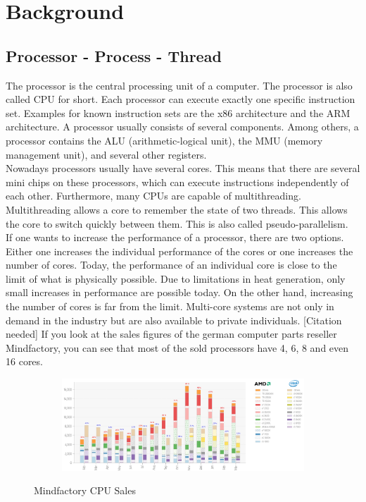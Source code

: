 
\chapter{Background}

\section{Processor - Process - Thread}

The processor is the central processing unit of a computer. The processor is also called CPU for short. Each processor can execute exactly one specific instruction set. Examples for known instruction sets are the x86 architecture and the ARM architecture. A processor usually consists of several components. Among others, a processor contains the ALU (arithmetic-logical unit), the MMU (memory management unit), and several other registers. \cite{Tannenbaum:21}
\\
Nowadays processors usually have several cores. \cite{Tannenbaum:87} This means that there are several mini chips on these processors, which can execute instructions independently of each other. Furthermore, many CPUs are capable of multithreading. Multithreading allows a core to remember the state of two threads. This allows the core to switch quickly between them. This is also called pseudo-parallelism.\cite{Tannenbaum:23}
\\
If one wants to increase the performance of a processor, there are two options. Either one increases the individual performance of the cores or one increases the number of cores. Today, the performance of an individual core is close to the limit of what is physically possible. Due to limitations in heat generation, only small increases in performance are possible today. On the other hand, increasing the number of cores is far from the limit. Multi-core systems are not only in demand in the industry but are also available to private individuals. [Citation needed]
If you look at the sales figures of the german computer parts reseller Mindfactory, you can see that most of the sold processors have 4, 6, 8 and even 16 cores. 

\begin{figure}[H]
  \centering
  \begin{subfigure}[b]{1.0\textwidth}
    \includegraphics[width=1.0\linewidth]{img/mindfactory-sales2.png}
  \end{subfigure}
  \caption{Mindfactory CPU Sales \cite{forbes:mindfactory:sales}}
  \label{Mindfactory CPU Sales}
\end{figure}

